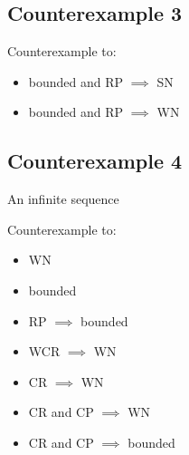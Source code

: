 \documentclass{scrartcl}
\begin{document}
\subsection*{Counterexample 3}

\begin{center}
\end{center}
Counterexample to:
\begin{itemize}
  \item bounded and RP $\implies$ SN
  \item bounded and RP $\implies$ WN
\end{itemize}

\subsection*{Counterexample 4}
An infinite sequence
  \begin{center}
    \end{center}
Counterexample to:
\begin{itemize}
  \item WN
  \item bounded
  \item RP $\implies$ bounded
  \item WCR $\implies$ WN
  \item CR $\implies$ WN
  \item CR and CP $\implies$ WN
  \item CR and CP $\implies$ bounded
\end{itemize}
\end{document}
